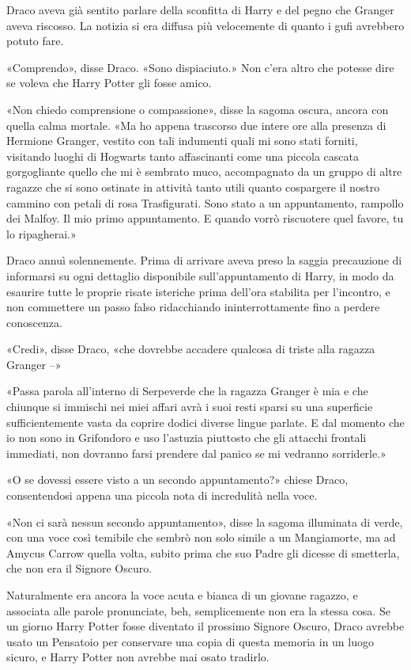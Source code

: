 Draco aveva già sentito parlare della sconfitta di Harry e del pegno che Granger aveva riscosso. La notizia si era diffusa più velocemente di quanto i gufi avrebbero potuto fare.

«Comprendo», disse Draco. «Sono dispiaciuto.» Non c’era altro che potesse dire se voleva che Harry Potter gli fosse amico.

«Non chiedo comprensione o compassione», disse la sagoma oscura, ancora con quella calma mortale. «Ma ho appena trascorso due intere ore alla presenza di Hermione Granger, vestito con tali indumenti quali mi sono stati forniti, visitando luoghi di Hogwarts tanto affascinanti come una piccola cascata gorgogliante quello che mi è sembrato muco, accompagnato da un gruppo di altre ragazze che si sono ostinate in attività tanto utili quanto cospargere il nostro cammino con petali di rosa Trasfigurati. Sono stato a un appuntamento, rampollo dei Malfoy. Il mio primo appuntamento. E quando vorrò riscuotere quel favore, tu lo ripagherai.»

Draco annuì solennemente. Prima di arrivare aveva preso la saggia precauzione di informarsi su ogni dettaglio disponibile sull’appuntamento di Harry, in modo da esaurire tutte le proprie risate isteriche prima dell’ora stabilita per l’incontro, e non commettere un passo falso ridacchiando ininterrottamente fino a perdere conoscenza.

«Credi», disse Draco, «che dovrebbe accadere qualcosa di triste alla ragazza Granger –»

«Passa parola all’interno di Serpeverde che la ragazza Granger è mia e che chiunque si immischi nei miei affari avrà i suoi resti sparsi su una superficie sufficientemente vasta da coprire dodici diverse lingue parlate. E dal momento che io non sono in Grifondoro e uso l’astuzia piuttosto che gli attacchi frontali immediati, non dovranno farsi prendere dal panico se mi vedranno sorriderle.»

«O se dovessi essere visto a un secondo appuntamento?» chiese Draco, consentendosi appena una piccola nota di incredulità nella voce.

«Non ci sarà nessun secondo appuntamento», disse la sagoma illuminata di verde, con una voce così temibile che sembrò non solo simile a un Mangiamorte, ma ad Amycus Carrow quella volta, subito prima che suo Padre gli dicesse di smetterla, che non era il Signore Oscuro.

Naturalmente era ancora la voce acuta e bianca di un giovane ragazzo, e associata alle parole pronunciate, beh, semplicemente non era la stessa cosa. Se un giorno Harry Potter fosse diventato il prossimo Signore Oscuro, Draco avrebbe usato un Pensatoio per conservare una copia di questa memoria in un luogo sicuro, e Harry Potter non avrebbe mai osato tradirlo.

